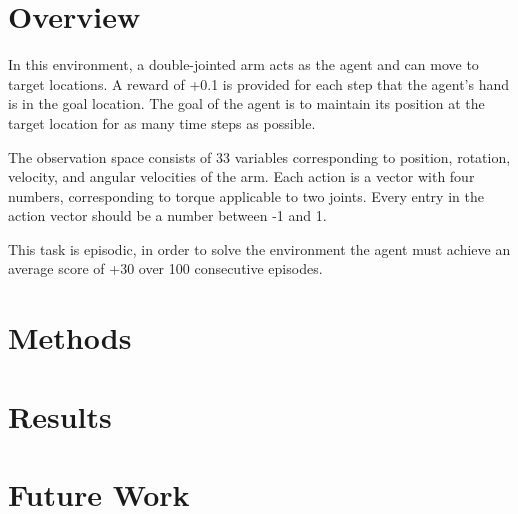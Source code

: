 \documentclass[12pt]{article}
\begin{document}
\maketitle


\section{Overview}
In this environment, a double-jointed arm acts as the agent and can move to target locations.
A reward of +0.1 is provided for each step that the agent's hand is in the goal location. 
The goal of the agent is to maintain its position at the target location for as many time steps as possible.

The observation space consists of 33 variables corresponding to position, rotation, velocity, and angular velocities of the arm. 
Each action is a vector with four numbers, corresponding to torque applicable to two joints. 
Every entry in the action vector should be a number between -1 and 1.

This task is episodic,  in order to solve the environment the agent must achieve an average score of +30 over 100 consecutive episodes.

\section{Methods}
\section{Results}
\section{Future Work}

\printbibliography
\end{document}
